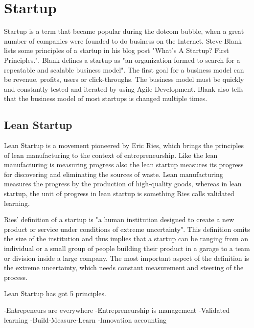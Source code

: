 
 \section{Startup}

Startup is a term that became popular during the dotcom bubble, when a great number of companies were founded to do business on the Internet. Steve Blank lists some principles of a startup in his blog post "What’s A Startup? First Principles.". Blank defines a startup as "an organization formed to search for a repeatable and scalable business model". The first goal for a business model can be revenue, profits, users or click-throughs. The business model must be quickly and constantly tested and iterated by using Agile Development. Blank also tells that the business model of most startups is changed multiple times.~\cite{blank2010startup}

 \subsection{Lean Startup}
 
Lean Startup is a movement pioneered by Eric Ries, which brings the principles of lean manufacturing to the context of entrepreneurship. Like the lean manufacturing is measuring progress also the lean startup measures its progress for discovering and eliminating the sources of waste. Lean manufacturing measures the progress by the production of high-quality goods, whereas in lean startup, the unit of progress in lean startup is something Ries calls validated learning.

Ries' definition of a startup is "a human institution designed to create a new product or service under conditions of extreme uncertainty". This definition omits the size of the institution and thus implies that a startup can be ranging from an individual or a small group of people building their product in a garage to a team or division inside a large company. The most important aspect of the definition is the extreme uncertainty, which needs constant measurement and steering of the process.

Lean Startup has got 5 principles. 


-Entrepeneurs are everywhere
-Entrepreneurship is management
-Validated learning
-Build-Measure-Learn
-Innovation accounting


% 

